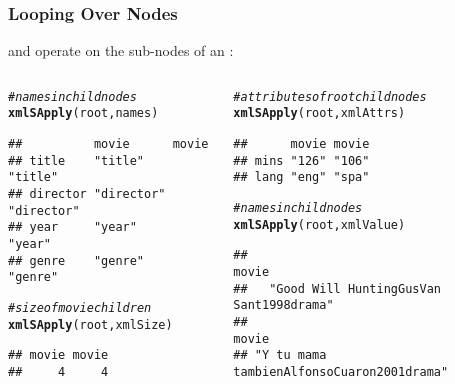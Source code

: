 \documentclass[12pt]{beamer}\usepackage[]{graphicx}\usepackage[]{color}
\makeatletter
\newcommand{\hlcom}[1]{\textcolor[rgb]{0.678,0.584,0.686}{\textit{#1}}}%
\newcommand{\hlstd}[1]{\textcolor[rgb]{0.345,0.345,0.345}{#1}}%
\newcommand{\hlkwd}[1]{\textcolor[rgb]{0.737,0.353,0.396}{\textbf{#1}}}%
\newenvironment{kframe}{%
 \def\at@end@of@kframe{}%
 \ifinner\ifhmode%
  \def\at@end@of@kframe{\end{minipage}}%
  \begin{minipage}{\columnwidth}%
 \fi\fi%
 \def\FrameCommand##1{\hskip\@totalleftmargin \hskip-\fboxsep
 \colorbox{shadecolor}{##1}\hskip-\fboxsep
     \hskip-\linewidth \hskip-\@totalleftmargin \hskip\columnwidth}%
 \MakeFramed {\advance\hsize-\width
   \@totalleftmargin\z@ \linewidth\hsize
   \@setminipage}}%
 {\par\unskip\endMakeFramed%
 \at@end@of@kframe}
\newenvironment{knitrout}{}{} %
\makeatother
\begin{document}

\begin{frame}[fragile]
\frametitle{Looping Over Nodes}

{\hilit {}} and {\hilit {}} operate on the sub-nodes of an :

\begin{columns}[t]
\begin{column}{0.5\textwidth}
\begin{knitrout}\tiny
{}\color{fgcolor}\begin{kframe}
\begin{alltt}
\hlcom{# names in child nodes}
\hlkwd{xmlSApply}\hlstd{(root, names)}
\end{alltt}
\begin{verbatim}
##          movie      movie     
## title    "title"    "title"   
## director "director" "director"
## year     "year"     "year"    
## genre    "genre"    "genre"
\end{verbatim}
\begin{alltt}
\hlcom{# size of movie children}
\hlkwd{xmlSApply}\hlstd{(root, xmlSize)}
\end{alltt}
\begin{verbatim}
## movie movie 
##     4     4
\end{verbatim}
\end{kframe}
\end{knitrout}
\end{column}

\begin{column}{0.5\textwidth}
\begin{knitrout}\tiny
{}\color{fgcolor}\begin{kframe}
\begin{alltt}
\hlcom{# attributes of root child nodes}
\hlkwd{xmlSApply}\hlstd{(root, xmlAttrs)}
\end{alltt}
\begin{verbatim}
##      movie movie
## mins "126" "106"
## lang "eng" "spa"
\end{verbatim}
\begin{alltt}
\hlcom{# names in child nodes}
\hlkwd{xmlSApply}\hlstd{(root, xmlValue)}
\end{alltt}
\begin{verbatim}
##                                     movie 
##   "Good Will HuntingGusVan Sant1998drama" 
##                                     movie 
## "Y tu mama tambienAlfonsoCuaron2001drama"
\end{verbatim}
\end{kframe}
\end{knitrout}
\end{column}
\end{columns}

\end{frame}
\end{document}
